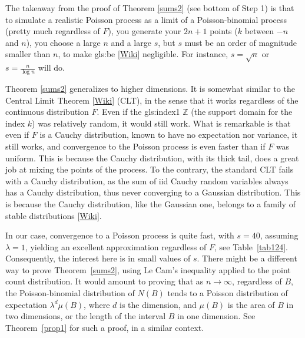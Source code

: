\documentclass[10pt]{article}
\begin{document}
The takeaway from the proof of Theorem \ref{sums2} (see bottom of Step 1) is that to simulate a realistic Poisson process as a limit of a Poisson-binomial process (pretty much regardless of $F$), you generate your $2n+1$ points ($k$ between $-n$ and $n$), you choose a large $n$ and a large $s$, but $s$ must be an order of magnitude smaller than $n$, to make 
\gls{gls:be} [\href{https://en.wikipedia.org/wiki/Boundary_problem_(spatial_analysis)}{Wiki}]  negligible. For instance, $s=\sqrt{n}$ or $s=\frac{n}{\log n}$ will do. 

Theorem \ref{sums2} generalizes to higher dimensions. It is somewhat similar to 
the \textcolor{index}{Central Limit Theorem} [\href{https://en.wikipedia.org/wiki/Central_limit_theorem}{Wiki}] (CLT), 
in the sense that it works regardless of the continuous distribution $F$. Even if the 
 \gls{gls:index1} $\mathbb{Z}$ (the support domain for the \textcolor{index}{index} $k$) was relatively random, it would still work. What is remarkable is that even if $F$ is a \textcolor{index}{Cauchy distribution}, known to have no expectation nor variance, it still works, and convergence to the Poisson process is even faster than if $F$ was uniform. This is because the Cauchy distribution, with its thick tail, does a great job at mixing the points of the process. To the contrary, the standard CLT fails with a Cauchy distribution, as the sum of iid Cauchy random variables always has a Cauchy distribution, thus never converging to a Gaussian distribution. This is because the Cauchy distribution, like the Gaussian one, belongs to a family of 
\textcolor{index}{stable distributions} [\href{https://en.wikipedia.org/wiki/Stable_distribution}{Wiki}]. 

In our case, convergence to a Poisson process is quite fast, with $s=40$, assuming $\lambda=1$, yielding an excellent approximation regardless of $F$, see Table~\ref{tab124}. Consequently, the interest here is in small values of $s$. There might be a different way to prove Theorem~\ref{sums2}, using \textcolor{index}{Le Cam's inequality} \cite{lecam} applied to the point count distribution. It would amount to proving that as $n\rightarrow\infty$, regardless of $B$, the Poisson-binomial distribution of $N(B)$ tends to a Poisson distribution of expectation $\lambda^d\mu(B)$, where $d$ is the dimension, and $\mu(B)$ is the area of $B$ in two dimensions, or the length of the interval $B$ in one dimension. See Theorem~\ref{prop1} for such a proof, in a similar context. 
\end{document}

